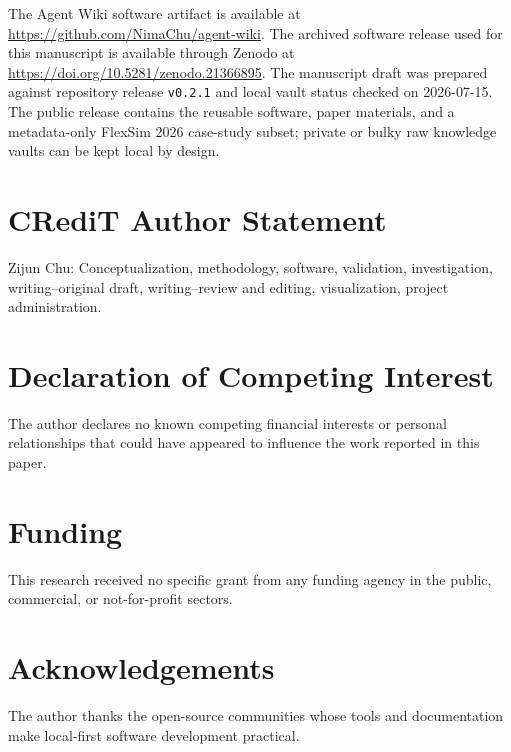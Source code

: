 \documentclass[11pt]{article}
\begin{document}
The Agent Wiki software artifact is available at
\url{https://github.com/NimaChu/agent-wiki}. The archived software release used
for this manuscript is available through Zenodo at
\url{https://doi.org/10.5281/zenodo.21366895}. The manuscript draft was prepared
against repository release \texttt{v0.2.1} and local vault status checked on
2026-07-15. The public release contains the reusable software, paper materials,
and a metadata-only FlexSim 2026 case-study subset; private or bulky raw
knowledge vaults can be kept local by design.

\section*{CRediT Author Statement}

Zijun Chu: Conceptualization, methodology, software, validation, investigation,
writing--original draft, writing--review and editing, visualization, project
administration.

\section*{Declaration of Competing Interest}

The author declares no known competing financial interests or personal
relationships that could have appeared to influence the work reported in this
paper.

\section*{Funding}

This research received no specific grant from any funding agency in the public,
commercial, or not-for-profit sectors.

\section*{Acknowledgements}

The author thanks the open-source communities whose tools and documentation
make local-first software development practical.
\end{document}
